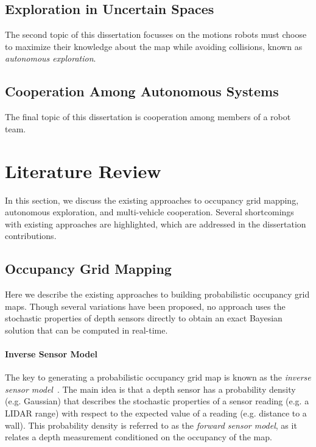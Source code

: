 \documentclass[thesis]{thesis-gwu}
\begin{document}
\subsection{Exploration in Uncertain Spaces}

The second topic of this dissertation focusses on the motions robots must choose to maximize their knowledge about the map while avoiding collisions, known as \emph{autonomous exploration}.

\subsection{Cooperation Among Autonomous Systems}

The final topic of this dissertation is cooperation among members of a robot team.

\section{Literature Review}

In this section, we discuss the existing approaches to occupancy grid mapping, autonomous exploration, and multi-vehicle cooperation. Several shortcomings with existing approaches are highlighted, which are addressed in the dissertation contributions.

\subsection{Occupancy Grid Mapping}

Here we describe the existing approaches to building probabilistic occupancy grid maps. Though several variations have been proposed, no approach uses the stochastic properties of depth sensors directly to obtain an exact Bayesian solution that can be computed in real-time.

\paragraph{Inverse Sensor Model} The key to generating a probabilistic occupancy grid map is known as the \emph{inverse sensor model}~\cite{ThrBurFox05}. The main idea is that a depth sensor has a probability density (e.g. Gaussian) that describes the stochastic properties of a sensor reading (e.g. a LIDAR range) with respect to the expected value of a reading (e.g. distance to a wall). This probability density is referred to as the \emph{forward sensor model}, as it relates a depth measurement conditioned on the occupancy of the map. 
\end{document}
